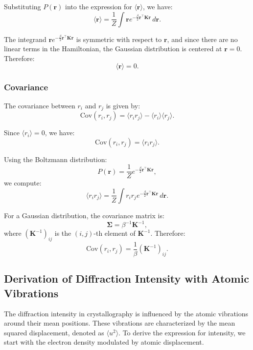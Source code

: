 \documentclass[English, Lau, oneside]{sapthesis}
\begin{document}
\begin{itemize}
Substituting \(P(\bm{r})\) into the expression for \(\langle \bm{r} \rangle\), we have:
\begin{equation}
\langle \bm{r} \rangle = \frac{1}{Z} \int \bm{r} e^{-\frac{\beta}{2} \bm{r}^\top \mathbf{K} \bm{r}} \, d\bm{r}.
\end{equation}

The integrand \(\bm{r} e^{-\frac{\beta}{2} \bm{r}^\top \mathbf{K} \bm{r}}\) is symmetric with respect to \(\bm{r}\), and since there are no linear terms in the Hamiltonian, the Gaussian distribution is centered at \(\bm{r} = 0\). Therefore:
\begin{equation}
\langle \bm{r} \rangle = 0.
\end{equation}

\subsubsection{Covariance}
The covariance between \(r_i\) and \(r_j\) is given by:
\begin{equation}
\text{Cov}(r_i, r_j) = \langle r_i r_j \rangle - \langle r_i \rangle \langle r_j \rangle.
\end{equation}

Since \(\langle r_i \rangle = 0\), we have:
\begin{equation}
\text{Cov}(r_i, r_j) = \langle r_i r_j \rangle.
\end{equation}

Using the Boltzmann distribution:
\begin{equation}
P(\bm{r}) = \frac{1}{Z} e^{-\frac{\beta}{2} \bm{r}^\top \mathbf{K} \bm{r}},
\end{equation}
we compute:
\begin{equation}
\langle r_i r_j \rangle = \frac{1}{Z} \int r_i r_j e^{-\frac{\beta}{2} \bm{r}^\top \mathbf{K} \bm{r}} \, d\bm{r}.
\end{equation}

For a Gaussian distribution, the covariance matrix is:
\begin{equation}
\bm{\Sigma} = \beta^{-1} \mathbf{K}^{-1},
\end{equation}
where \((\mathbf{K}^{-1})_{ij}\) is the \((i,j)\)-th element of \(\mathbf{K}^{-1}\). Therefore:
\begin{equation}
\text{Cov}(r_i, r_j) = \frac{1}{\beta} (\mathbf{K}^{-1})_{ij}.
\end{equation}

\subsection*{Derivation of Diffraction Intensity with Atomic Vibrations}
The diffraction intensity in crystallography is influenced by the atomic vibrations around their mean positions. These vibrations are characterized by the mean squared displacement, denoted as $\langle u^2 \rangle$. To derive the expression for intensity, we start with the electron density modulated by atomic displacement.


\end{itemize}
\end{document}
